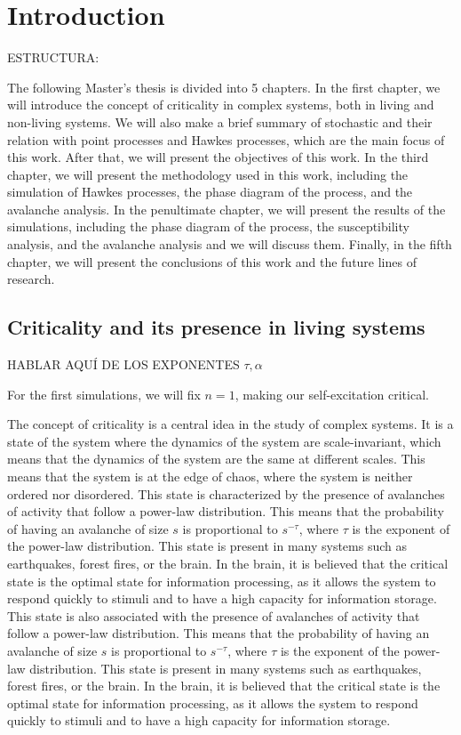 \chapter{Introduction}\label{ch:intro}

ESTRUCTURA:

The following Master's thesis is divided into 5 chapters. In the first chapter, we will introduce the concept of criticality in complex systems, both in living and non-living systems.  
We will also make a brief summary of stochastic and their relation with point processes and Hawkes processes, which are the main focus of this work. 
After that, we will present the objectives of this work. In the third chapter, we will present the methodology used in this work, including the simulation of Hawkes processes, 
the phase diagram of the process, and the avalanche analysis. In the penultimate chapter, we will present the results of the simulations, including the phase diagram of the process, the 
susceptibility analysis, and the avalanche analysis and we will discuss them. Finally, in the fifth chapter, we will present the conclusions of this work and the future lines of research.


\section{Criticality and its presence in living systems}

HABLAR AQUÍ DE LOS EXPONENTES $\tau,\alpha$

For the first simulations, we will fix $n=1$, making our self-excitation critical. 

The concept of criticality is a central idea in the study of complex systems. It is a state of the system where the dynamics of the system are scale-invariant, which means that the
dynamics of the system are the same at different scales. This means that the system is at the edge of chaos, where the system is neither ordered nor disordered. This state is characterized
by the presence of avalanches of activity that follow a power-law distribution. This means that the probability of having an avalanche of size $s$ is proportional to $s^{-\tau}$, where
$\tau$ is the exponent of the power-law distribution. This state is present in many systems such as earthquakes, forest fires, or the brain. In the brain, it is believed that the
critical state is the optimal state for information processing, as it allows the system to respond quickly to stimuli and to have a high capacity for information storage. This state
is also associated with the presence of avalanches of activity that follow a power-law distribution. This means that the probability of having an avalanche of size $s$ is proportional
to $s^{-\tau}$, where $\tau$ is the exponent of the power-law distribution. This state is present in many systems such as earthquakes, forest fires, or the brain. In the brain, it is
believed that the critical state is the optimal state for information processing, as it allows the system to respond quickly to stimuli and to have a high capacity for information storage.



